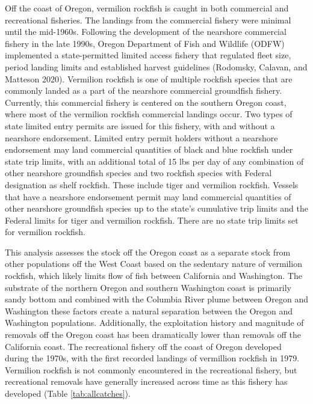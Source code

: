 \documentclass[11pt,
  english,
  a4paper,
]{article}
\begin{document}
Off the coast of Oregon, vermilion rockfish is caught in both commercial and recreational fisheries. The landings from the commercial fishery were minimal until the mid-1960s. Following the development of the nearshore commercial fishery in the late 1990s, Oregon Department of Fish and Wildlife (ODFW) implemented a state-permitted limited access fishery that regulated fleet size, period landing limits and established harvest guidelines {(Rodomsky, Calavan, and Matteson 2020)\leavevmode\tagmcend\tagstructend}. Vermilion rockfish is one of multiple rockfish species that are commonly landed as a part of the nearshore commercial groundfish fishery. Currently, this commercial fishery is centered on the southern Oregon coast, where most of the vermilion rockfish commercial landings occur. Two types of state limited entry permits are issued for this fishery, with and without a nearshore endorsement. Limited entry permit holders without a nearshore endorsement may land commercial quantities of black and blue rockfish under state trip limits, with an additional total of 15 lbs per day of any combination of other nearshore groundfish species and two rockfish species with Federal designation as shelf rockfish. These include tiger and vermilion rockfish. Vessels that have a nearshore endorsement permit may land commercial quantities of other nearshore groundfish species up to the state's cumulative trip limits and the Federal limits for tiger and vermilion rockfish. There are no state trip limits set for vermilion rockfish.

\leavevmode\tagmcend\tagstructend\par


This analysis assesses the stock off the Oregon coast as a separate stock from other populations off the West Coast based on the sedentary nature of vermilion rockfish, which likely limits flow of fish between California and Washington. The substrate of the northern Oregon and southern Washington coast is primarily sandy bottom and combined with the Columbia River plume between Oregon and Washington these factors create a natural separation between the Oregon and Washington populations. Additionally, the exploitation history and magnitude of removals off the Oregon coast has been dramatically lower than removals off the California coast. The recreational fishery off the coast of Oregon developed during the 1970s, with the first recorded landings of vermillion rockfish in 1979. Vermilion rockfish is not commonly encountered in the recreational fishery, but recreational removals have generally increased across time as this fishery has developed (Table \ref{tab:allcatches}).
\end{document}
